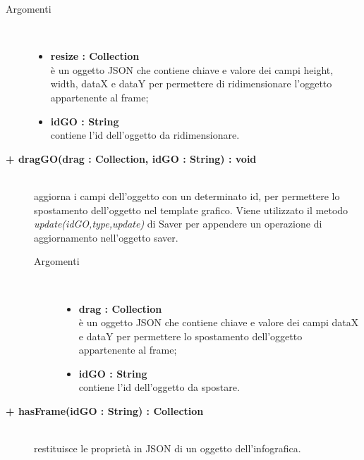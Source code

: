 \begin{description}
\begin{description}
\begin{description}
			\item[Argomenti] \hfill \\
				\begin{itemize}
					\item \textbf{resize : Collection			} \hfill \\
					è un oggetto JSON che contiene chiave e valore dei campi height, width, dataX e dataY per permettere di ridimensionare l'oggetto appartenente al frame;
					\item \textbf{idGO : String			} \hfill \\
					contiene l'id dell'oggetto da ridimensionare.
				\end{itemize}

\end{description}

\end{description}

\begin{description}
		\item[\textbf{\color{blue}+ dragGO(drag : Collection, idGO : String) : void			}] \hfill \\
			aggiorna i campi dell'oggetto con un determinato id, per permettere lo spostamento dell'oggetto nel template grafico. Viene utilizzato il metodo \textit{update(idGO,type,update)} di Saver per appendere un operazione di aggiornamento nell'oggetto saver.     

\begin{description}
			\item[Argomenti] \hfill \\
				\begin{itemize}
					\item \textbf{drag : Collection			} \hfill \\
					è un oggetto JSON che contiene chiave e valore dei campi dataX e dataY per permettere lo spostamento dell'oggetto appartenente al frame;
					\item \textbf{idGO : String			} \hfill \\
					contiene l'id dell'oggetto da spostare.
				\end{itemize}

\end{description}

\end{description}

\begin{description}
		\item[\textbf{\color{blue}+ hasFrame(idGO : String) : Collection			}] \hfill \\
			restituisce le proprietà in JSON di un oggetto dell'infografica.     


\end{description}
\end{description}
